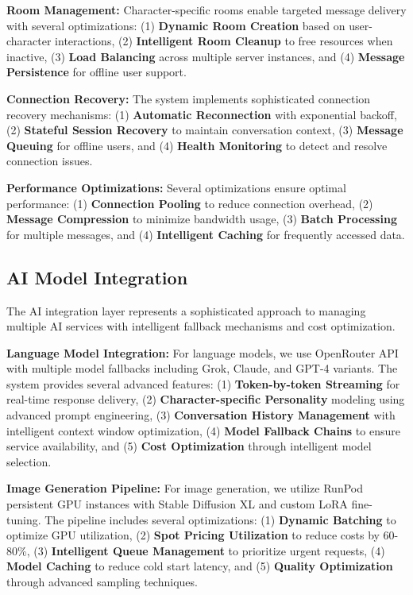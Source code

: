 \documentclass[conference]{IEEEtran}
\begin{document}
\textbf{Room Management:} Character-specific rooms enable targeted message delivery with several optimizations: (1) \textbf{Dynamic Room Creation} based on user-character interactions, (2) \textbf{Intelligent Room Cleanup} to free resources when inactive, (3) \textbf{Load Balancing} across multiple server instances, and (4) \textbf{Message Persistence} for offline user support.

\textbf{Connection Recovery:} The system implements sophisticated connection recovery mechanisms: (1) \textbf{Automatic Reconnection} with exponential backoff, (2) \textbf{Stateful Session Recovery} to maintain conversation context, (3) \textbf{Message Queuing} for offline users, and (4) \textbf{Health Monitoring} to detect and resolve connection issues.

\textbf{Performance Optimizations:} Several optimizations ensure optimal performance: (1) \textbf{Connection Pooling} to reduce connection overhead, (2) \textbf{Message Compression} to minimize bandwidth usage, (3) \textbf{Batch Processing} for multiple messages, and (4) \textbf{Intelligent Caching} for frequently accessed data.

\subsection{AI Model Integration}
The AI integration layer represents a sophisticated approach to managing multiple AI services with intelligent fallback mechanisms and cost optimization.

\textbf{Language Model Integration:} For language models, we use OpenRouter API with multiple model fallbacks including Grok, Claude, and GPT-4 variants. The system provides several advanced features: (1) \textbf{Token-by-token Streaming} for real-time response delivery, (2) \textbf{Character-specific Personality} modeling using advanced prompt engineering, (3) \textbf{Conversation History Management} with intelligent context window optimization, (4) \textbf{Model Fallback Chains} to ensure service availability, and (5) \textbf{Cost Optimization} through intelligent model selection.

\textbf{Image Generation Pipeline:} For image generation, we utilize RunPod persistent GPU instances with Stable Diffusion XL and custom LoRA fine-tuning. The pipeline includes several optimizations: (1) \textbf{Dynamic Batching} to optimize GPU utilization, (2) \textbf{Spot Pricing Utilization} to reduce costs by 60-80\%, (3) \textbf{Intelligent Queue Management} to prioritize urgent requests, (4) \textbf{Model Caching} to reduce cold start latency, and (5) \textbf{Quality Optimization} through advanced sampling techniques.
\end{document}
